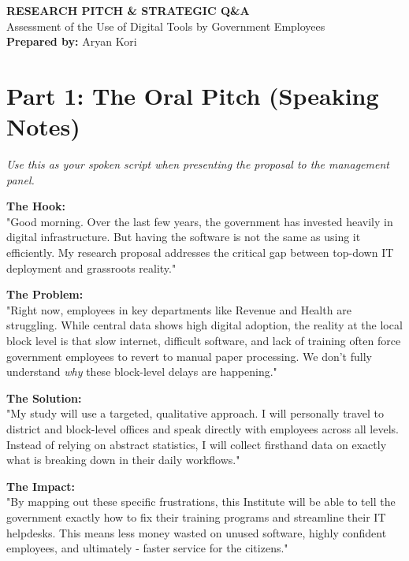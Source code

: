 \documentclass[11pt,a4paper]{article}
\begin{document}
\begin{center}
    \vspace*{1cm}
    \Huge\color{navyblue}\textbf{RESEARCH PITCH \& STRATEGIC Q\&A} \\[0.5em]
    \large\color{gray}Assessment of the Use of Digital Tools by Government Employees \\[0.2cm]
    \normalsize\color{gold}\textbf{Prepared by:} Aryan Kori
    \vspace{1cm}
\end{center}

\section*{Part 1: The Oral Pitch (Speaking Notes)}
\textit{Use this as your spoken script when presenting the proposal to the management panel.}

\vspace{0.3cm}
\textbf{The Hook:} \\
"Good morning. Over the last few years, the government has invested heavily in digital infrastructure. But having the software is not the same as using it efficiently. My research proposal addresses the critical gap between top-down IT deployment and grassroots reality."

\vspace{0.2cm}
\textbf{The Problem:} \\
"Right now, employees in key departments like Revenue and Health are struggling. While central data shows high digital adoption, the reality at the local block level is that slow internet, difficult software, and lack of training often force government employees to revert to manual paper processing. We don't fully understand \textit{why} these block-level delays are happening."

\vspace{0.2cm}
\textbf{The Solution:} \\
"My study will use a targeted, qualitative approach. I will personally travel to district and block-level offices and speak directly with employees across all levels. Instead of relying on abstract statistics, I will collect firsthand data on exactly what is breaking down in their daily workflows."

\vspace{0.2cm}
\textbf{The Impact:} \\
"By mapping out these specific frustrations, this Institute will be able to tell the government exactly how to fix their training programs and streamline their IT helpdesks. This means less money wasted on unused software, highly confident employees, and ultimately - faster service for the citizens."
\end{document}
